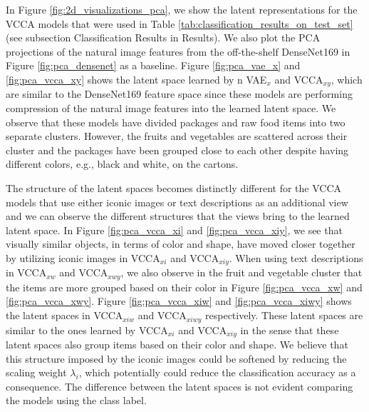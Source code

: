 In Figure \ref{fig:2d_visualizations_pca}, we show the latent representations for the VCCA models that were used in Table \ref{tab:classification_results_on_test_set} (see subsection Classification Results in Results).
We also plot the PCA projections of the natural image features from the off-the-shelf DenseNet169 in Figure \ref{fig:pca_densenet} as a baseline. Figure \ref{fig:pca_vae_x} and \ref{fig:pca_vcca_xy} shows the latent space learned by n VAE$_{x}$ and VCCA$_{x y}$, which are similar to the DenseNet169 feature space since these models are performing compression of the natural image features into the learned latent space. We observe that these models have divided packages and raw food items into two separate clusters. However, the fruits and vegetables are scattered across their cluster and the packages have been grouped close to each other despite having different colors, e.g., black and white, on the cartons. 

The structure of the latent spaces becomes distinctly different for the VCCA models that use either iconic images or text descriptions as an additional view and we can observe the different structures that the views bring to the learned latent space. In Figure \ref{fig:pca_vcca_xi} and \ref{fig:pca_vcca_xiy}, we see that visually similar objects, in terms of color and shape, have moved closer together by utilizing iconic images in VCCA$_{x i}$ and VCCA$_{x i y}$. When using text descriptions in VCCA$_{x w}$ and VCCA$_{x w y}$, we also observe in the fruit and vegetable cluster that the items are more grouped based on their color in Figure \ref{fig:pca_vcca_xw} and \ref{fig:pca_vcca_xwy}. 
Figure \ref{fig:pca_vcca_xiw} and \ref{fig:pca_vcca_xiwy} shows the latent spaces in VCCA$_{x i w}$ and VCCA$_{x i w y}$ respectively. These latent spaces are similar to the ones learned by VCCA$_{x i}$ and VCCA$_{x i y}$ in the sense that these latent spaces also group items based on their color and shape. We believe that this structure imposed by the iconic images could be softened by reducing the scaling weight $\lambda_{i}$, which potentially could reduce the classification accuracy as a consequence. The difference between the latent spaces is not evident comparing the models using the class label.

\vspace{-3mm}
